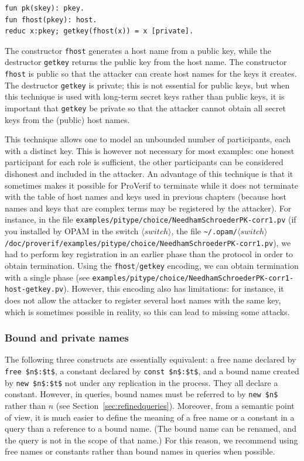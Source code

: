 \documentclass{book}
\newcommand{\nonterm}[1]{\langle\mathit{#1}\rangle}
\newcommand{\switchdir}{\nonterm{switch}}
\newcommand{\opamsubdir}[1]{\nolinkurl{~/.opam/}$\switchdir$\nolinkurl{/#1}}
\begin{document}
\begin{enumerate}
\begin{lstlisting}[numbers=none]
fun pk(skey): pkey.
fun fhost(pkey): host.
reduc x:pkey; getkey(fhost(x)) = x [private].
\end{lstlisting}
%
The constructor \lstinline!fhost! generates a host name from a public
key, while the destructor \lstinline!getkey! returns the public key
from the host name. The constructor \lstinline!fhost! is public so that
the attacker can create host names for the keys it creates.  The
destructor \lstinline!getkey! is private; this is not essential for
public keys, but when this technique is used with long-term secret
keys rather than public keys, it is important that \lstinline!getkey!
be private so that the attacker cannot obtain all secret keys from
the (public) host names.

This technique allows one to model an unbounded number of
participants, each with a distinct key. This is however not necessary
for most examples: one honest participant for each role is sufficient,
the other participants can be considered dishonest and included in
the attacker.
%
An advantage of this technique is that it sometimes makes it
possible for ProVerif to terminate while it does not terminate
with the table of host names and keys used in previous chapters
(because host names and keys that are complex terms may be registered
by the attacker). For instance, in the file
{\tt examples/pitype/choice/NeedhamSchroederPK-corr1.pv} (if you installed by OPAM
in the switch $\switchdir$, the file \opamsubdir{doc/proverif/examples/pitype/choice/NeedhamSchroederPK-corr1.pv}),
we had to perform key registration in an earlier phase than the
protocol in order to obtain termination. Using the \lstinline!fhost!/\lstinline!getkey! encoding, we can obtain termination with a single phase
(see {\tt examples/pitype/choice/NeedhamSchroederPK-corr1-host-getkey.pv}).
%
However, this encoding also has limitations: for instance, it does not allow
the attacker to register several host names with the same key,
which is sometimes possible in reality, so this can lead to missing
some attacks.

\end{enumerate}


\subsubsection{Bound and private names}

The following three constructs are essentially equivalent: a free name
declared by \lstinline!free $n$:$t$!, a constant declared by
\lstinline!const $n$:$t$!, and a bound name created by
\lstinline!new $n$:$t$!
not under any replication in the process. They all declare a
constant. However, in queries, bound names must be referred to by
\lstinline!new $n$! rather than $n$ (see
Section~\ref{sec:refinedqueries}). Moreover, from a semantic point of
view, it is much easier to define the meaning of a free name or a
constant in a query than a reference to a bound name. (The bound name
can be renamed, and the query is not in the scope of that name.)
For this reason, we
recommend using free names or constants rather than bound names
in queries when possible.
\end{document}
